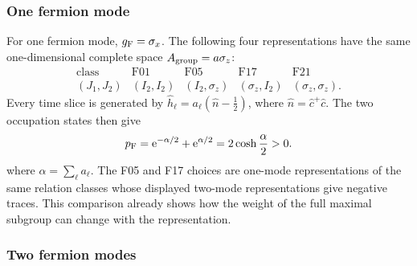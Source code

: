 \documentclass[onecolumn,aps,prb,amsmath,amssymb,superscriptaddress,longbibliography,floatfix]{revtex4-2}
\newcommand{\ee}{\mathrm{e}}
\begin{document}
\subsubsection{One fermion mode}

For one fermion mode, \(g_{\rm F}=\sigma_x\).  The following four
representations have the same one-dimensional complete space
\(A_{\rm group}=a\sigma_z\):
\begin{equation}
\begin{array}{c|cccc}
\text{class}&\mathrm{F01}&\mathrm{F05}&\mathrm{F17}&\mathrm{F21}\\ \hline
(J_1,J_2)&(I_2,I_2)&(I_2,\sigma_z)&(\sigma_z,I_2)&
(\sigma_z,\sigma_z).
\end{array}
    \label{eq:one_mode_commuting_representations}
\end{equation}
Every time slice is generated by
\(\hat h_\ell=a_\ell(\hat n-\frac12)\), where
\(\hat n=\hat c^+\hat c\).  The two occupation states then give
\begin{equation}
    p_{\rm F}
    =\ee^{-\alpha/2}+\ee^{\alpha/2}
    =2\cosh\frac{\alpha}{2}>0.
    \label{eq:one_mode_commuting_weight}
\end{equation}
where \(\alpha=\sum_\ell a_\ell\).  The F05 and F17 choices are one-mode
representations of the same relation classes whose displayed two-mode
representations give negative traces.  This comparison already shows how the
weight of the full maximal subgroup can change with the representation.

\subsubsection{Two fermion modes}
\end{document}
